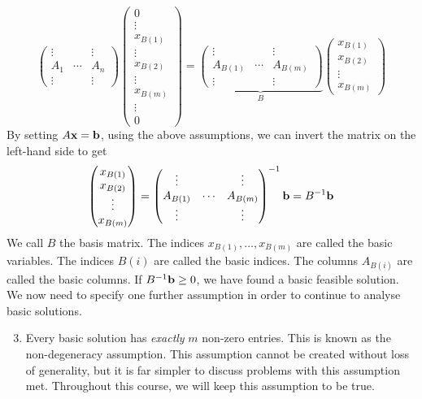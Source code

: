 \[
	\begin{pmatrix}
		\vdots &        & \vdots \\
		A_1    & \cdots & A_n    \\
		\vdots &        & \vdots
	\end{pmatrix} \begin{pmatrix}
		0 \\ \vdots \\ x_{B(1)} \\ \vdots \\ x_{B(2)} \\ \vdots \\ x_{B(m)} \\ \vdots \\ 0
	\end{pmatrix} = \underbrace{\begin{pmatrix}
			\vdots   &        & \vdots   \\
			A_{B(1)} & \cdots & A_{B(m)} \\
			\vdots   &        & \vdots
		\end{pmatrix}}_{B} \begin{pmatrix}
		x_{B(1)} \\
		x_{B(2)} \\
		\vdots   \\
		x_{B(m)}
	\end{pmatrix}
\]
By setting \( A \vb x = \vb b \), using the above assumptions, we can invert the matrix on the left-hand side to get
\[
	\begin{pmatrix}
		x_{B(1)} \\
		x_{B(2)} \\
		\vdots   \\
		x_{B(m)}
	\end{pmatrix} = \begin{pmatrix}
		\vdots   &        & \vdots   \\
		A_{B(1)} & \cdots & A_{B(m)} \\
		\vdots   &        & \vdots
	\end{pmatrix}^{-1} \vb b = B^{-1} \vb b
\]
We call \( B \) the basis matrix.
The indices \( x_{B(1)}, \dots, x_{B(m)} \) are called the basic variables.
The indices \( B(i) \) are called the basic indices.
The columns \( A_{B(i)} \) are called the basic columns.
If \( B^{-1} \vb b \geq 0 \), we have found a basic feasible solution.
We now need to specify one further assumption in order to continue to analyse basic solutions.
\begin{enumerate}[A:]
	\setcounter{enumi}{2}
	\item Every basic solution has \textit{exactly} \( m \) non-zero entries.
	      This is known as the non-degeneracy assumption.
	      This assumption cannot be created without loss of generality, but it is far simpler to discuss problems with this assumption met.
	      Throughout this course, we will keep this assumption to be true.
\end{enumerate}

